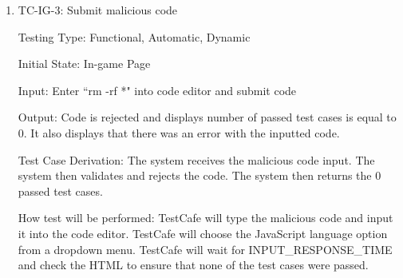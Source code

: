\documentclass[12pt, titlepage]{article}
\begin{document}
\begin{enumerate}
\item{TC-IG-3: Submit malicious code}

Testing Type: Functional, Automatic, Dynamic
					
Initial State: In-game Page
					
Input: Enter ``rm -rf *" into code editor and submit code
					
Output: Code is rejected and displays number of passed test cases is equal to 0. It also displays that there was an error with the inputted code.

Test Case Derivation: The system receives the malicious code input. The system then validates and rejects the code. The system then returns the 0 passed test cases.
					
How test will be performed:  TestCafe will type the malicious code and input it into the code editor. TestCafe will choose the JavaScript language option from a dropdown menu. TestCafe will wait for INPUT\_RESPONSE\_TIME and check the HTML to ensure that none of the test cases were passed. 

\end{enumerate}
\end{document}
